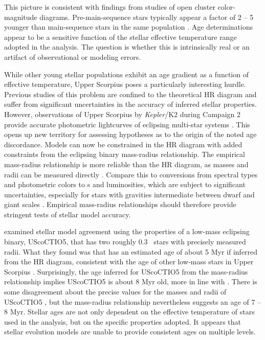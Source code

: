 \documentclass{aa}
\begin{document}
This picture is consistent with findings from studies of open cluster color-magnitude diagrams. Pre-main-sequence stars typically appear a factor of 2 -- 5 younger than main-sequence stars in the same population \citep{Naylor2009, Bell2012, Bell2013}. Age determinations appear to be a sensitive function of the stellar effective temperature range adopted in the analysis. The question is whether this is intrinsically real or an artifact of observational or modeling errors. 

While other young stellar populations exhibit an age gradient as a function of effective temperature, Upper Scorpius poses a particularly interesting hurdle. Previous studies of this problem are confined to the theoretical HR diagram and suffer from significant uncertainties in the accuracy of inferred stellar properties. However, observations of Upper Scorpius by \emph{Kepler}/K2 during Campaign 2 provide accurate photometric lightcurves of eclipsing multi-star systems \citep{Kraus2015, Alonso2015, David2016, Lodieu2015}. This opens up new territory for assessing hypotheses as to the origin of the noted age discordance. Models can now be constrained in the HR diagram with added constraints from the eclipsing binary mass-radius relationship. The empirical mass-radius relationship is more reliable than the HR diagram, as masses and radii can be measured directly \citep[e.g.,][]{Andersen1991,Torres2010}. Compare this to conversions from spectral types and photometric colors to \teff s and luminosities, which are subject to significant uncertainties, especially for stars with gravities intermediate between dwarf and giant scales \citep[see, e.g.,][]{Pecaut2013}. Empirical mass-radius relationships should therefore provide stringent tests of stellar model accuracy.

\citet{Kraus2015} examined stellar model agreement using the properties of a low-mass eclipsing binary, UScoCTIO5, that has two roughly 0.3 \msun\ stars with precisely measured radii. What they found was that  has an estimated age of about 5 Myr if inferred from the HR diagram, consistent with the age of other low-mass stars in Upper Scorpius \citep{Preibisch2002, Slesnick2008}. Surprisingly, the age inferred for UScoCTIO5 from the mass-radius relationship implies UScoCTIO5 is about 8 Myr old, more in line with \citet{Pecaut2012}. There is some disagreement about the precise values for the masses and radii of UScoCTIO5 \citep{David2016}, but the mass-radius relationship nevertheless suggests an age of 7 -- 8 Myr. Stellar ages are not only dependent on the effective temperature of stars used in the analysis, but on the specific properties adopted. It appears that stellar evolution models are unable to provide consistent ages on multiple levels.
\end{document}
